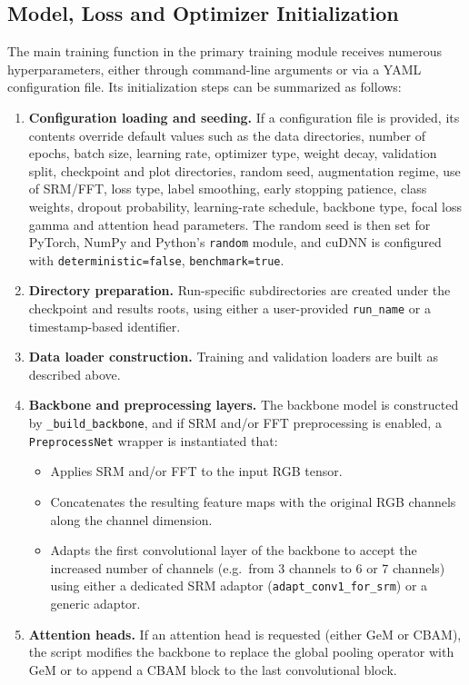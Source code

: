 \subsection{Model, Loss and Optimizer Initialization}

The main training function in the primary training module receives numerous hyperparameters, either through command-line arguments or via a YAML configuration file. Its initialization steps can be summarized as follows:
\begin{enumerate}
  \item \textbf{Configuration loading and seeding.} If a configuration file is provided, its contents override default values such as the data directories, number of epochs, batch size, learning rate, optimizer type, weight decay, validation split, checkpoint and plot directories, random seed, augmentation regime, use of SRM/FFT, loss type, label smoothing, early stopping patience, class weights, dropout probability, learning-rate schedule, backbone type, focal loss gamma and attention head parameters. The random seed is then set for PyTorch, NumPy and Python's \texttt{random} module, and cuDNN is configured with \texttt{deterministic=false}, \texttt{benchmark=true}.
  \item \textbf{Directory preparation.} Run-specific subdirectories are created under the checkpoint and results roots, using either a user-provided \texttt{run\_name} or a timestamp-based identifier.
  \item \textbf{Data loader construction.} Training and validation loaders are built as described above.
  \item \textbf{Backbone and preprocessing layers.} The backbone model is constructed by \texttt{\_build\_backbone}, and if SRM and/or FFT preprocessing is enabled, a \texttt{PreprocessNet} wrapper is instantiated that:
  \begin{itemize}
    \item Applies SRM and/or FFT to the input RGB tensor.
    \item Concatenates the resulting feature maps with the original RGB channels along the channel dimension.
    \item Adapts the first convolutional layer of the backbone to accept the increased number of channels (e.g.\ from 3 channels to 6 or 7 channels) using either a dedicated SRM adaptor (\texttt{adapt\_conv1\_for\_srm}) or a generic adaptor.
  \end{itemize}
  \item \textbf{Attention heads.} If an attention head is requested (either GeM or CBAM), the script modifies the backbone to replace the global pooling operator with GeM or to append a CBAM block to the last convolutional block.

\end{enumerate}
